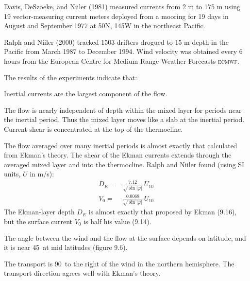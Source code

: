 Davis, DeSzoeke, and Niiler (1981) measured currents from 2 m to 175 m
using 19 vector-measuring current meters deployed from a mooring for
19 days in August and September 1977 at 50\degrees N, 145\degrees W in
the northeast Pacific.

Ralph and Niiler (2000) tracked 1503
drifters drogued to 15 m
depth in the Pacific from March 1987 to December 1994. Wind velocity
was obtained every 6 hours from the European Centre for Medium-Range
Weather Forecasts \textsc{ecmwf}.

The results of the experiments indicate that:
\begin{enumerate}
\vitem Inertial currents are the largest component of the flow.

\vitem The flow is nearly independent of depth within the mixed
layer for periods near the inertial
period. Thus the mixed layer moves like a slab
at the inertial period. Current shear is concentrated at the top of
the thermocline.

\vitem The flow averaged over many inertial periods is almost exactly
that calculated from Ekman's theory. The shear of the Ekman currents
extends through the averaged mixed layer and into the thermocline. Ralph and Niiler found (using SI
units, $U$ in m/s):
\begin{align}
D_E =& \frac{7.12}{\sqrt{\sin|\varphi|}}\, U_{10}\\
V_0 =& \frac{0.0068}{\sqrt{\sin|\varphi|}}\, U_{10}
\end{align}
The Ekman-layer depth $D_E$ is almost exactly that proposed by Ekman
(9.16), but the surface current $V_0$ is half his value (9.14).

\vitem The angle between the wind and the flow at the surface depends
on latitude, and it is near 45\degrees\ at mid latitudes (figure 9.6).

\vitem The transport is 90\degrees\ to the right
of the wind in the northern hemisphere. The
transport direction agrees well with Ekman's theory.
\end{enumerate}
